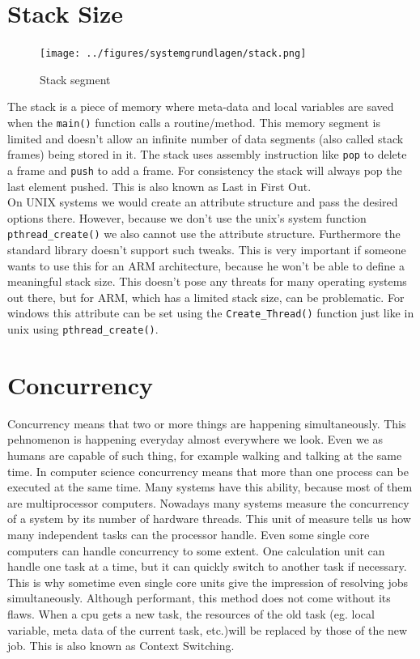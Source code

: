 \section{Stack Size}
\begin{figure}
	\centering
	\texttt{[image: ../figures/systemgrundlagen/stack.png]}
	\caption{Stack segment}
	\cite{stack}
\end{figure}
The stack is a piece of memory where meta-data and local variables are saved when the \texttt{main()} function calls a routine/method. This memory segment is limited and doesn't allow an infinite number of data segments (also called stack frames) being stored in it. The stack uses assembly instruction like \texttt{pop} to delete a frame and \texttt{push} to add a frame. For consistency the stack will always pop the last element pushed. This is also known as \dq Last in First Out\dq{}\cite{stack}.\\
On UNIX systems we would create an attribute structure and pass the
desired options there. However, because we don't use the unix's system function \texttt{pthread\_create()} we also
cannot use the attribute structure. Furthermore the standard library doesn't support such tweaks. 
This is very important if someone wants to use this for an ARM architecture, because he won't be
able to define a meaningful stack size. This doesn't pose any threats for many operating systems out
there, but for ARM, which has a limited stack size, can be problematic. For windows this attribute
can be set using the \texttt{Create\_Thread()} function just like in unix using \texttt{pthread\_create()}.
\section{Concurrency}
\label{ssec:concurrency}
Concurrency means that two or more things are happening simultaneously. This pehnomenon is happening
everyday almost everywhere we look. Even we as humans are capable of such thing, for example walking
and talking at the same time. In computer science concurrency means that more than one process can
be executed at the same time. Many systems have this ability, because most of them are
multiprocessor computers. Nowadays many systems measure the concurrency of a system by its number of hardware threads. This
unit of measure tells us how many independent tasks can the processor handle. Even some single core computers can handle concurrency to some extent.
One calculation unit can handle one task at a time, but it can quickly switch to another task if
necessary. This is why sometime even single core units give the impression of resolving jobs
simultaneously\cite[Chapter~1]{concurrency}. Although performant, this method does not come without its flaws. When a cpu gets a new task, the resources of the old task (eg. local variable, meta data of the current task, etc.)will be replaced by those of the new job. This is also known as \dq Context Switching\dq{}.\\
